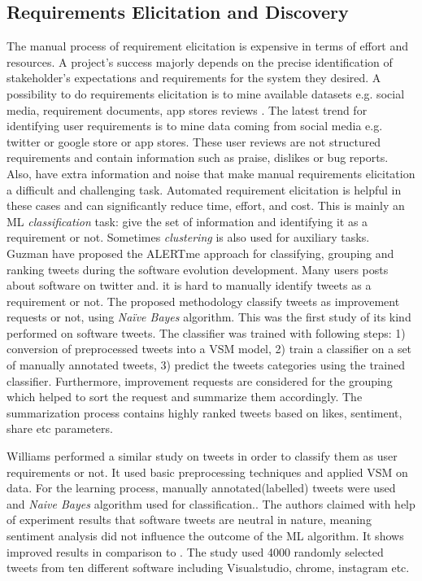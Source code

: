 
\subsection{Requirements Elicitation and Discovery}

The manual process of requirement elicitation is expensive in terms of
effort and resources. A project's success majorly depends
on the precise identification of stakeholder's expectations and requirements for
the system they desired.
A possibility to do requirements elicitation is to mine available datasets e.g.
social media, requirement documents, app stores reviews . The latest trend for
identifying user requirements is to mine data coming from social media e.g. twitter or
google store or app stores. These user reviews are not structured requirements
and contain information such as praise, dislikes or bug reports. Also, have extra information and noise that make manual requirements elicitation a difficult and challenging task.
Automated requirement elicitation is helpful in these cases and can
significantly reduce time, effort, and cost. This is mainly an ML
\emph{classification} task: give the set of information and identifying it as a
requirement or not. Sometimes \emph{clustering} is also used for auxiliary
tasks.\\

Guzman \etal \cite{Guzman:2017} have proposed the ALERTme approach for
classifying, grouping and ranking tweets during the software
evolution development. Many users posts about software on twitter and. it is hard to manually identify tweets as a requirement or not. The proposed methodology classify tweets as improvement requests or not, using \emph{Naïve Bayes} algorithm. This was the first study of
its kind performed on software tweets. 
The classifier was trained with following steps: 1) conversion of
preprocessed tweets into a VSM model, 2) train a classifier
on a set of manually annotated tweets, 3) predict the tweets categories using the trained classifier. Furthermore, improvement
requests are considered for the grouping which helped to sort the
request and summarize them accordingly. The summarization process contains highly ranked tweets based on likes, sentiment, share etc parameters.

Williams \etal \cite{Williams:2017} performed a similar study on tweets in order
to classify them as user requirements or not. It used basic preprocessing techniques and applied VSM on data. For the learning
process, manually annotated(labelled) tweets were used and \emph{Naive Bayes} algorithm used for classification.. The authors claimed with help of experiment results that
software tweets are neutral in nature, meaning sentiment analysis did not
influence the outcome of the ML algorithm. It shows improved results in comparison to \cite{Guzman:2017}.
The study used 4000 randomly selected tweets from ten different
software including Visualstudio, chrome, instagram etc.\\

